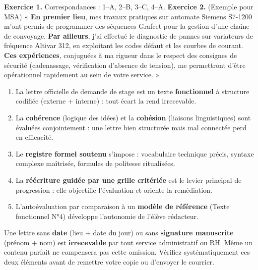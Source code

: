 \documentclass[11pt]{article}
\begin{document}
\begin{corrige}
\textbf{Exercice 1.} Correspondances : 1--A, 2--B, 3--C, 4--A.
\textbf{Exercice 2.} (Exemple pour MSA) « \textbf{En premier lieu}, mes travaux pratiques sur automate Siemens S7-1200 m'ont permis de programmer des séquences Grafcet pour la gestion d'une chaîne de convoyage. \textbf{Par ailleurs}, j'ai effectué le diagnostic de pannes sur variateurs de fréquence Altivar 312, en exploitant les codes défaut et les courbes de courant. \textbf{Ces expériences}, conjuguées à ma rigueur dans le respect des consignes de sécurité (cadenassage, vérification d'absence de tension), me permettront d'être opérationnel rapidement au sein de votre service. »
\end{corrige}

\begin{aretenir}
\begin{enumerate}
\item La lettre officielle de demande de stage est un texte \textbf{fonctionnel} à structure codifiée (externe + interne) : tout écart la rend irrecevable.
\item La \textbf{cohérence} (logique des idées) et la \textbf{cohésion} (liaisons linguistiques) sont évaluées conjointement : une lettre bien structurée mais mal connectée perd en efficacité.
\item Le \textbf{registre formel soutenu} s'impose : vocabulaire technique précis, syntaxe complexe maîtrisée, formules de politesse ritualisées.
\item La \textbf{réécriture guidée par une grille critériée} est le levier principal de progression : elle objectifie l'évaluation et oriente la remédiation.
\item L'autoévaluation par comparaison à un \textbf{modèle de référence} (Texte fonctionnel N°4) développe l'autonomie de l'élève rédacteur.
\end{enumerate}
\end{aretenir}

\begin{attention}
Une lettre sans \textbf{date} (lieu + date du jour) ou sans \textbf{signature manuscrite} (prénom + nom) est \textbf{irrecevable} par tout service administratif ou RH. Même un contenu parfait ne compensera pas cette omission. Vérifiez systématiquement ces deux éléments avant de remettre votre copie ou d'envoyer le courrier.
\end{attention}
\end{document}
